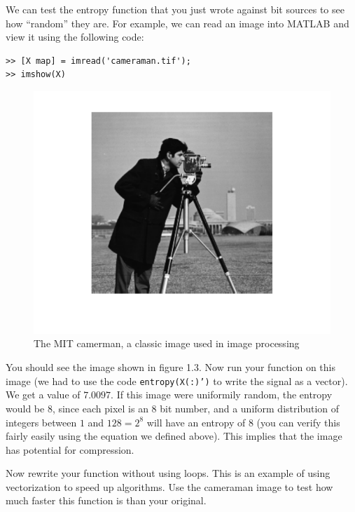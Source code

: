 We can test the entropy function that you just wrote against bit sources to see how ``random'' they are. For example, we can read an image into MATLAB and view it using the following code:
\begin{verbatim}
>> [X map] = imread('cameraman.tif');
>> imshow(X)
\end{verbatim}

\begin{figure}[h!]
\begin{center}
\includegraphics{./Figures/cameramanClean.pdf}
\end{center}
\caption{The MIT camerman, a classic image used in image processing}
\end{figure}
You should see the image shown in figure 1.3. Now run your function on this image (we had to use the code {\tt entropy(X(:)')} to write the signal as a vector). We get a value of $7.0097$. If this image were uniformily random, the entropy would be $8$, since each pixel is an $8$ bit number, and a uniform distribution of integers between $1$ and $128 = 2^8$ will have an entropy of $8$ (you can verify this fairly easily using the equation we defined above). This implies that the image has potential for compression.

\begin{problem}
Now rewrite your function without using loops. This is an example of using vectorization to speed up algorithms. Use the cameraman image to test how much faster this function is than your original.
\end{problem}

